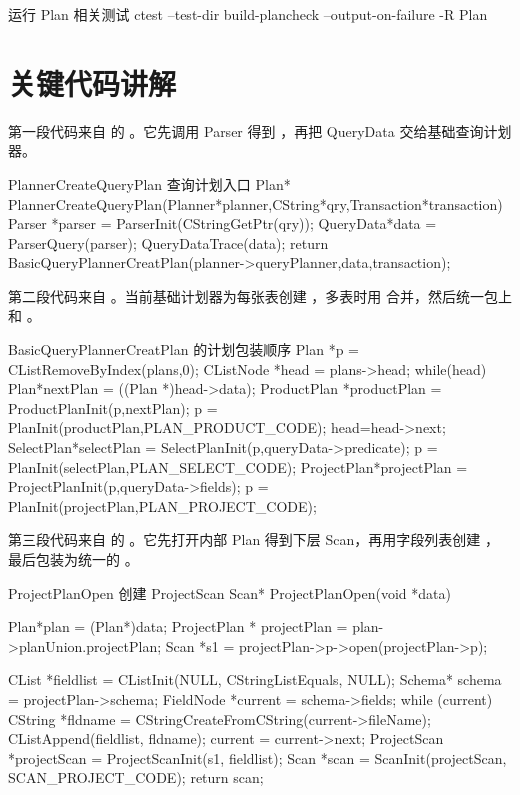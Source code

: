\begin{dbcode}[listing options={language=bash}]{运行 Plan 相关测试}
ctest --test-dir build-plancheck --output-on-failure -R Plan
\end{dbcode}

\section{关键代码讲解}
\label{sec:plan-scan-code}

第一段代码来自  的 。它先调用 Parser 得到 ，再把 QueryData 交给基础查询计划器。

\begin{dbcode}{PlannerCreateQueryPlan 查询计划入口}
Plan* PlannerCreateQueryPlan(Planner*planner,CString*qry,Transaction*transaction){
    Parser *parser = ParserInit(CStringGetPtr(qry));
    QueryData*data = ParserQuery(parser);
    QueryDataTrace(data);
    return BasicQueryPlannerCreatPlan(planner->queryPlanner,data,transaction);
}
\end{dbcode}

第二段代码来自 。当前基础计划器为每张表创建 ，多表时用  合并，然后统一包上  和 。

\begin{dbcode}{BasicQueryPlannerCreatPlan 的计划包装顺序}
Plan *p = CListRemoveByIndex(plans,0);
CListNode *head = plans->head;
while(head){
    Plan*nextPlan = ((Plan *)head->data);
    ProductPlan *productPlan = ProductPlanInit(p,nextPlan);
    p = PlanInit(productPlan,PLAN_PRODUCT_CODE);
    head=head->next;
}
SelectPlan*selectPlan = SelectPlanInit(p,queryData->predicate);
p = PlanInit(selectPlan,PLAN_SELECT_CODE);
ProjectPlan*projectPlan = ProjectPlanInit(p,queryData->fields);
p = PlanInit(projectPlan,PLAN_PROJECT_CODE);
\end{dbcode}

第三段代码来自  的 。它先打开内部 Plan 得到下层 Scan，再用字段列表创建 ，最后包装为统一的 。

\begin{dbcode}{ProjectPlanOpen 创建 ProjectScan}
Scan* ProjectPlanOpen(void *data){
    Plan*plan = (Plan*)data;
    ProjectPlan * projectPlan = plan->planUnion.projectPlan;
    Scan *s1 = projectPlan->p->open(projectPlan->p);

    CList *fieldlist = CListInit(NULL, CStringListEquals, NULL);
    Schema* schema = projectPlan->schema;
    FieldNode *current = schema->fields;
    while (current) {
        CString *fldname = CStringCreateFromCString(current->fileName);
        CListAppend(fieldlist, fldname);
        current = current->next;
    }
    ProjectScan *projectScan = ProjectScanInit(s1, fieldlist);
    Scan *scan = ScanInit(projectScan, SCAN_PROJECT_CODE);
    return scan;
}
\end{dbcode}

